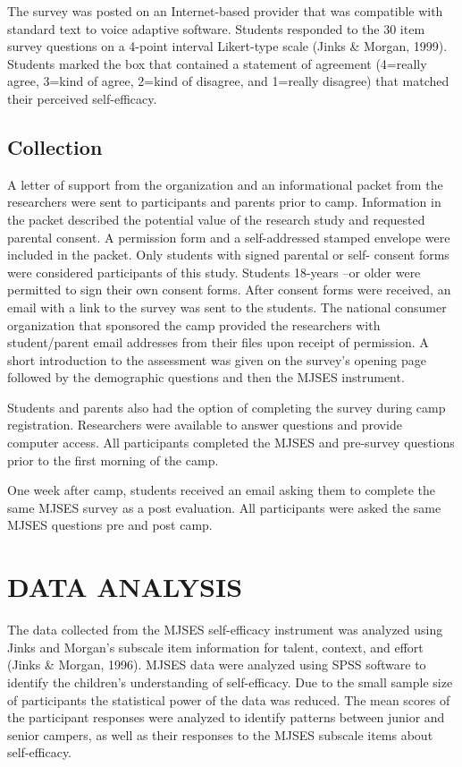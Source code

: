 \documentclass[11.5pt]{sig-alternate} %
\begin{document}
\begin{large}
The survey was posted on an Internet-based provider that was compatible with standard text to voice adaptive software. Students responded to the 30 item survey questions on a 4-point interval Likert-type scale (Jinks \& Morgan, 1999). Students marked the box that contained a statement of agreement (4=really agree, 3=kind of agree, 2=kind of disagree, and 1=really disagree) that matched their perceived self-efficacy. 

\subsection*{Collection}

A letter of support from the organization and an informational packet from the researchers were sent to participants and parents prior to camp. Information in the packet described the potential value of the research study and requested parental consent. A permission form and a self-addressed stamped envelope were included in the packet. Only students with signed parental or self- consent forms were considered participants of this study. Students 18-years –or older were permitted to sign their own consent forms. After consent forms were received, an email with a link to the survey was sent to the students. The national consumer organization that sponsored the camp provided the researchers with student/parent email addresses from their files upon receipt of permission. A short introduction to the assessment was given on the survey’s opening page followed by the demographic questions and then the MJSES instrument.  

Students and parents also had the option of completing the survey during camp registration. Researchers were available to answer questions and provide computer access. All participants completed the MJSES and pre-survey questions prior to the first morning of the camp.  
	
One week after camp, students received an email asking them to complete the same MJSES survey as a post evaluation. All participants were asked the same MJSES questions pre and post camp. 

\section*{DATA ANALYSIS}
    
The data collected from the MJSES self-efficacy instrument was analyzed using Jinks and Morgan’s subscale item information for talent, context, and effort (Jinks \& Morgan, 1996).  MJSES data were analyzed using SPSS software to identify the children’s understanding of self-efficacy. Due to the small sample size of participants the statistical power of the data was reduced. The mean scores of the participant responses were analyzed to identify patterns between junior and senior campers, as well as their responses to the MJSES subscale items about self-efficacy.


\end{large}
\end{document}
